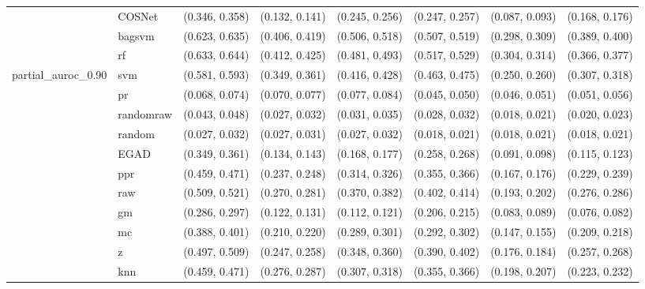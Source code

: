 \begin{table}[H]
{\begin{tabular}{llllllll}
 & COSNet & (0.346, 0.358) & (0.132, 0.141) & (0.245, 0.256) & (0.247, 0.257) & (0.087, 0.093) & (0.168, 0.176)\\

 & bagsvm & (0.623, 0.635) & (0.406, 0.419) & (0.506, 0.518) & (0.507, 0.519) & (0.298, 0.309) & (0.389, 0.400)\\

 & rf & (0.633, 0.644) & (0.412, 0.425) & (0.481, 0.493) & (0.517, 0.529) & (0.304, 0.314) & (0.366, 0.377)\\

\multirow{-15}{*}{\raggedright\arraybackslash partial\_auroc\_0.90} & svm & (0.581, 0.593) & (0.349, 0.361) & (0.416, 0.428) & (0.463, 0.475) & (0.250, 0.260) & (0.307, 0.318)\\
\cmidrule{1-8}
 & pr & (0.068, 0.074) & (0.070, 0.077) & (0.077, 0.084) & (0.045, 0.050) & (0.046, 0.051) & (0.051, 0.056)\\

 & randomraw & (0.043, 0.048) & (0.027, 0.032) & (0.031, 0.035) & (0.028, 0.032) & (0.018, 0.021) & (0.020, 0.023)\\

 & random & (0.027, 0.032) & (0.027, 0.031) & (0.027, 0.032) & (0.018, 0.021) & (0.018, 0.021) & (0.018, 0.021)\\

 & EGAD & (0.349, 0.361) & (0.134, 0.143) & (0.168, 0.177) & (0.258, 0.268) & (0.091, 0.098) & (0.115, 0.123)\\

 & ppr & (0.459, 0.471) & (0.237, 0.248) & (0.314, 0.326) & (0.355, 0.366) & (0.167, 0.176) & (0.229, 0.239)\\

 & raw & (0.509, 0.521) & (0.270, 0.281) & (0.370, 0.382) & (0.402, 0.414) & (0.193, 0.202) & (0.276, 0.286)\\

 & gm & (0.286, 0.297) & (0.122, 0.131) & (0.112, 0.121) & (0.206, 0.215) & (0.083, 0.089) & (0.076, 0.082)\\

 & mc & (0.388, 0.401) & (0.210, 0.220) & (0.289, 0.301) & (0.292, 0.302) & (0.147, 0.155) & (0.209, 0.218)\\

 & z & (0.497, 0.509) & (0.247, 0.258) & (0.348, 0.360) & (0.390, 0.402) & (0.176, 0.184) & (0.257, 0.268)\\

 & knn & (0.459, 0.471) & (0.276, 0.287) & (0.307, 0.318) & (0.355, 0.366) & (0.198, 0.207) & (0.223, 0.232)\\


\end{tabular}}
\end{table}
